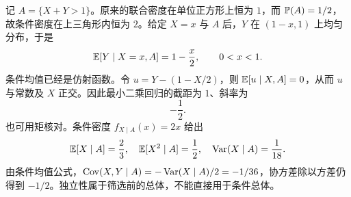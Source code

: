 记 $A=\{X+Y>1\}$。原来的联合密度在单位正方形上恒为 $1$，而 $\mathbb{P}(A)=1/2$，故条件密度在上三角形内恒为 $2$。给定 $X=x$ 与 $A$ 后，$Y$ 在 $(1-x,1)$ 上均匀分布，于是
\[
 \mathbb{E}[Y\mid X=x,A]=1-\frac x2,
 \qquad 0<x<1.
\]
条件均值已经是仿射函数。令 $u=Y-(1-X/2)$，则 $\mathbb{E}[u\mid X,A]=0$，从而 $u$ 与常数及 $X$ 正交。因此最小二乘回归的截距为 $1$、斜率为
\[
 \boxed{-\frac12}.
\]
也可用矩核对。条件密度 $f_{X\mid A}(x)=2x$ 给出
\[
 \mathbb{E}[X\mid A]=\frac23,\quad
 \mathbb{E}[X^2\mid A]=\frac12,\quad
 \operatorname{Var}(X\mid A)=\frac1{18}.
\]
由条件均值公式，$\operatorname{Cov}(X,Y\mid A)=-\operatorname{Var}(X\mid A)/2=-1/36$，协方差除以方差仍得到 $-1/2$。独立性属于筛选前的总体，不能直接用于条件总体。
